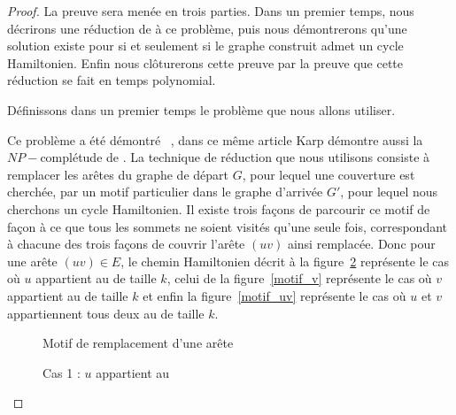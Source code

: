 \begin{proof}
    La preuve sera menée en trois parties. Dans un premier temps, nous décrirons une
    réduction de \vcover à ce problème, puis nous démontrerons qu'une solution existe pour \vcover
    si et seulement si le graphe construit admet un cycle Hamiltonien. Enfin nous clôturerons cette
    preuve par la preuve que cette réduction se fait en temps polynomial.

    Définissons dans un premier temps le problème \vcover que nous allons utiliser.


    Ce problème a été démontré \npc~\cite{karp}, dans ce même article Karp démontre aussi
    la $NP-$complétude de \hcycle. %
    La technique de réduction que nous utilisons consiste à remplacer les
    arêtes du graphe de départ $G$, pour lequel une couverture est cherchée, par un motif
    particulier dans le graphe d'arrivée $G'$, pour lequel nous cherchons un cycle Hamiltonien.
    Il existe trois façons de parcourir ce motif de façon à ce que tous les sommets ne soient
    visités qu'une seule fois, correspondant à chacune des trois façons de couvrir l'arête $(uv)$
    ainsi remplacée. Donc pour une arête $(uv) \in E$, le chemin
    Hamiltonien décrit à la figure~\ref{motif_u} représente le cas où $u$ appartient au \vcover de
    taille $k$, celui de la figure~\ref{motif_v} représente le cas où $v$ appartient au \vcover de
    taille $k$ et enfin la figure~\ref{motif_uv} représente le cas où $u$ et $v$ appartiennent tous
    deux au \vcover de taille $k$.

    \begin{figure}
        \begin{center}
            \begin{tikzpicture}
                
            \end{tikzpicture}
            \caption{Motif de remplacement d'une arête}
            \label{motif_npc}
        \end{center}
    \end{figure}

    \begin{figure}
        \begin{center}
            \begin{tikzpicture}
                
            \end{tikzpicture}
            \caption{Cas 1 : $u$ appartient au \vcover}
            \label{motif_u}
        \end{center}
    \end{figure}


\end{proof}
